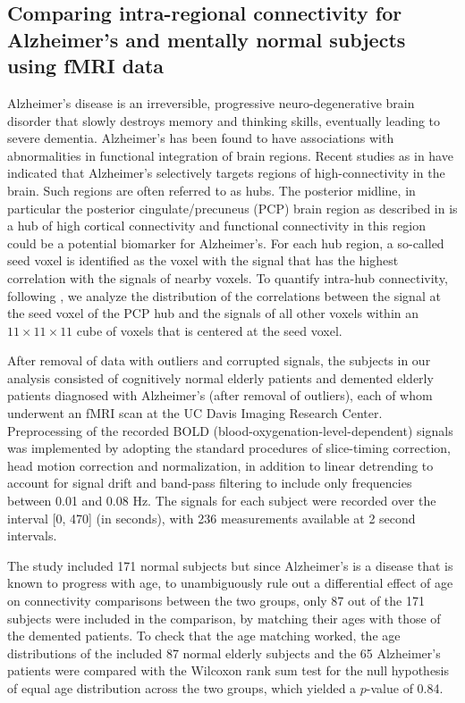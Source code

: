 \documentclass[lineno]{biometrika}
\def\ci{\cite}
\def\ci{\cite}
\begin{document}
\subsection{Comparing intra-regional connectivity for Alzheimer's and mentally normal subjects  using fMRI data}
\noindent Alzheimer’s disease  is an irreversible, progressive neuro-degenerative brain disorder that slowly destroys memory and thinking skills, eventually leading to severe dementia. Alzheimer's has been found to have associations with abnormalities in functional integration of brain regions. Recent studies as in 
\cite{sui:15} have indicated that Alzheimer's selectively targets regions of high-connectivity in the brain. Such regions are often referred to as hubs. %
The posterior midline, in particular the posterior cingulate/precuneus (PCP) brain region as described in \cite{buck:09} is a hub of high cortical connectivity and functional connectivity in this region could be a potential biomarker for Alzheimer's. For each hub region, a so-called seed voxel is identified as the voxel with the signal that has the highest correlation with the signals of nearby voxels. To quantify intra-hub connectivity, following \ci{mull:16:1},  we   analyze the distribution of the correlations between the signal at the seed voxel of the PCP hub and the signals of all other voxels within an $11 \times 11 \times 11$ cube of voxels that is centered at the seed voxel.  

After removal of data with outliers and  corrupted signals, the   subjects in our analysis consisted of cognitively normal
elderly patients and demented elderly patients diagnosed with Alzheimer's  (after removal of outliers), each of whom underwent an fMRI scan at the UC Davis Imaging Research Center. Preprocessing of the recorded BOLD (blood-oxygenation-level-dependent) signals was implemented by adopting the standard procedures of slice-timing correction, head motion correction and normalization, in addition to linear detrending to account for signal drift and band-pass filtering to include only frequencies between 0.01 and 0.08 Hz. The signals for each subject were recorded over the interval [0, 470]  (in seconds),
with 236 measurements available at 2 second intervals.

The study included 171 normal subjects but since Alzheimer's is a disease that is known to progress with age, to unambiguously rule out a differential effect of age on connectivity comparisons between the two groups,  only 87 out of the 171 subjects were included in the comparison, by matching their ages with those of the  demented patients. To check that the age matching worked, the age distributions of the included 87 normal elderly subjects  and the 65 Alzheimer's patients were compared with  the Wilcoxon rank sum test for the null hypothesis of equal age distribution across the two groups, which yielded  a $p$-value of 0.84.
\end{document}
